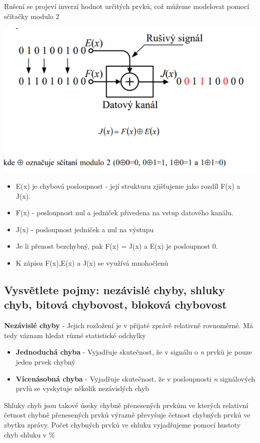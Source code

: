 Rušení se projeví inverzí hodnot určitých prvků, což můžeme modelovat pomocí sčítačky modulo 2

\includegraphics[]{images/ručení.png}
\begin{itemize}
    \item E(x) je chybová posloupnost - její strukturu zjišťujeme jako rozdíl F(x) a J(x).
    \item F(x) - posloupnost nul a jedniček přivedena na vstup datového kanálu.
    \item J(x) - posloupnost jedniček a nul na výstupu
    \item Je li přenost bezchybný, pak F(x) = J(x) a E(x) je posloupnost 0.
    \item K zápisu F(x),E(x) a J(x) se využívá mnohočlenů
\end{itemize}
\subsection{Vysvětlete pojmy: nezávislé chyby, shluky chyb, bitová chybovost, bloková chybovost}
\textbf{Nezávislé chyby} - Jejich rozložení je v přijaté zprávě relativně rovnoměrné.
Má tedy váznam hledat různé statistické odchylky
\begin{itemize}
    \item \textbf{Jednoduchá chyba} - Vyjadřuje skutečnost, že v signálu o \emph{n} prvků je pouze jeden prvek chybný
    \item \textbf{Vícenásobná chyba} - Vyjadřuje skutečnost, že v posloupnosti \emph{n} signálových prvlů se vyskytuje několik nezávislých chyb
\end{itemize}

Shluky chyb jsou takové úseky chybně přenesených prvkům ve kterých relativní četnost chybně přenesených prvků výrazně převyšuje četnost chybných prvků ve zbytku zprávy.
Počet chybných prvků ve shluku vyjadřujeme pomocí hustoty chyb shluku v \%

